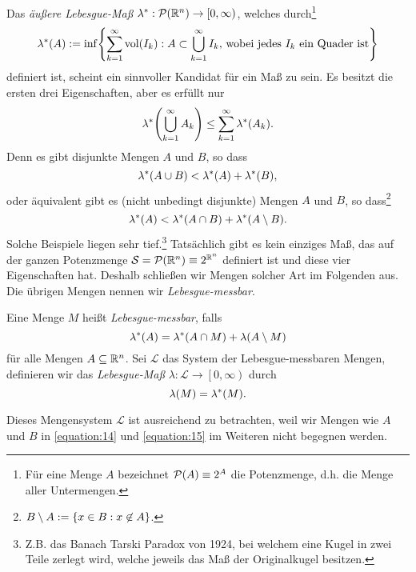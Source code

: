 Das \emph{äußere Lebesgue-Maß} \(\lambda^*: \mathcal{P}\parentheses*{\R^n} \to \left[0, \infty\right)\), welches durch\footnote{Für eine Menge \(A\) bezeichnet \(\mathcal{P}\parentheses*{A} \equiv 2^A\) die Potenzmenge, d.h. die Menge aller Untermengen.}
\[
	\lambda^*\parentheses*{A} := \inf\braces*{\sum_{k = 1}^\infty \vol\parentheses*{I_k} : A \subset \bigcup_{k = 1}^\infty I_k\text{, wobei jedes }I_k\text{ ein Quader ist}}
\]
definiert ist, scheint ein sinnvoller Kandidat für ein Maß zu sein.
Es besitzt die ersten drei Eigenschaften, aber es erfüllt nur
\begin{equation}\label{equation:13}
	\lambda^*\parentheses*{\bigcup_{k = 1}^\infty A_k} \le \sum_{k = 1}^\infty \lambda^*\parentheses*{A_k}.
\end{equation}
Denn es gibt disjunkte Mengen \(A\) und \(B\), so dass
\begin{equation}\label{equation:14}
	\lambda^*\parentheses*{A \cup B} < \lambda^*\parentheses*{A} + \lambda^*\parentheses*{B},
\end{equation}
oder äquivalent gibt es (nicht unbedingt disjunkte) Mengen \(A\) und \(B\), so dass\footnote{\(B \setminus A := \braces*{x \in B : x \not\in A}\).}
\begin{equation}\label{equation:15}
	\lambda^*\parentheses*{A} < \lambda^*\parentheses*{A \cap B} + \lambda^*\parentheses*{A \setminus B}.
\end{equation}
Solche Beispiele liegen sehr tief.\footnote{Z.B. das Banach Tarski Paradox von 1924, bei welchem eine Kugel in zwei Teile zerlegt wird, welche jeweils das Maß der Originalkugel besitzen.}
Tatsächlich gibt es kein einziges Maß, das auf der ganzen Potenzmenge \(\mathcal{S} = \mathcal{P}\parentheses*{\R^n} \equiv 2^{\R^n}\) definiert ist und diese vier Eigenschaften hat.
Deshalb schließen wir Mengen solcher Art im Folgenden aus.
Die übrigen Mengen nennen wir \emph{Lebesgue-messbar}.

\begin{definition}
	Eine Menge \(M\) heißt \emph{Lebesgue-messbar}, falls
	\[
		\lambda^*\parentheses*{A} = \lambda^*\parentheses*{A \cap M} + \lambda\parentheses*{A \setminus M}
	\]
	für alle Mengen \(A \subseteq \R^n\).
	Sei \(\mathcal{L}\) das System der Lebesgue-messbaren Mengen, definieren wir das \emph{Lebesgue-Maß} \(\lambda: \mathcal{L} \to \left[0, \infty\right)\) durch
	\[
		\lambda\parentheses*{M} = \lambda^*\parentheses*{M}.
	\]
\end{definition}

Dieses Mengensystem \(\mathcal{L}\) ist ausreichend zu betrachten, weil wir Mengen wie \(A\) und \(B\) in \eqref{equation:14} und \eqref{equation:15} im Weiteren nicht begegnen werden.

